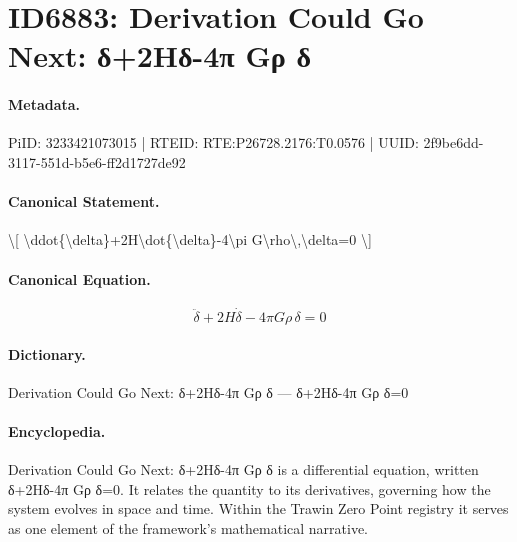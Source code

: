 \section*{ID6883: Derivation Could Go Next: δ+2Hδ-4π Gρ δ}
\paragraph{Metadata.}
PiID: 3233421073015 | RTEID: RTE:P26728.2176:T0.0576 | UUID: 2f9be6dd-3117-551d-b5e6-ff2d1727de92

\paragraph{Canonical Statement.}
\textbackslash{}[ \textbackslash{}ddot\{\textbackslash{}delta\}+2H\textbackslash{}dot\{\textbackslash{}delta\}-4\textbackslash{}pi G\textbackslash{}rho\textbackslash{},\textbackslash{}delta=0 \textbackslash{}]

\paragraph{Canonical Equation.}
\[
\ddot{\delta}+2H\dot{\delta}-4\pi G\rho\,\delta=0
\]

\paragraph{Dictionary.}
Derivation Could Go Next: δ+2Hδ-4π Gρ δ — δ+2Hδ-4π Gρ δ=0

\paragraph{Encyclopedia.}
Derivation Could Go Next: δ+2Hδ-4π Gρ δ is a differential equation, written δ+2Hδ-4π Gρ δ=0. It relates the quantity to its derivatives, governing how the system evolves in space and time. Within the Trawin Zero Point registry it serves as one element of the framework's mathematical narrative.
